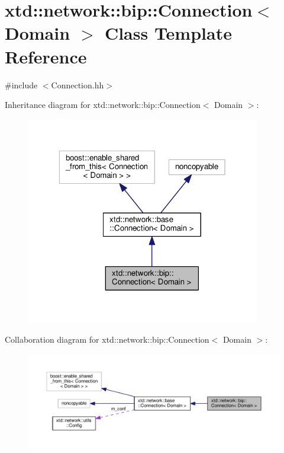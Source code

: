 \hypertarget{classxtd_1_1network_1_1bip_1_1Connection}{\section{xtd\-:\-:network\-:\-:bip\-:\-:Connection$<$ Domain $>$ Class Template Reference}
\label{classxtd_1_1network_1_1bip_1_1Connection}
}


{\ttfamily \#include $<$Connection.\-hh$>$}



Inheritance diagram for xtd\-:\-:network\-:\-:bip\-:\-:Connection$<$ Domain $>$\-:
\nopagebreak
\begin{figure}[H]
\begin{center}
\leavevmode
\includegraphics[width=289pt]{classxtd_1_1network_1_1bip_1_1Connection__inherit__graph}
\end{center}
\end{figure}


Collaboration diagram for xtd\-:\-:network\-:\-:bip\-:\-:Connection$<$ Domain $>$\-:
\nopagebreak
\begin{figure}[H]
\begin{center}
\leavevmode
\includegraphics[width=350pt]{classxtd_1_1network_1_1bip_1_1Connection__coll__graph}
\end{center}
\end{figure}

